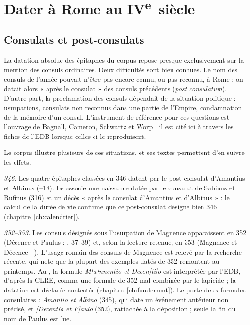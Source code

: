 \chapter{Dater à Rome au IV\textsuperscript{e}~siècle}\label{ch:dater}

\section{Consulats et post-consulats}

La datation absolue des épitaphes du corpus repose presque exclusivement sur la mention des consuls ordinaires. Deux difficultés sont bien connues. Le nom des consuls de l’année pouvait n’être pas encore connu, ou pas reconnu, à Rome : on datait alors « après le consulat » des consuls précédents (\emph{post consulatum}). D’autre part, la proclamation des consuls dépendait de la situation politique : usurpations, consulats non reconnus dans une partie de l’Empire, condamnation de la mémoire d’un consul. L’instrument de référence pour ces questions est l’ouvrage de Bagnall, Cameron, Schwartz et Worp ; il est cité ici à travers les fiches de l’EDB lorsque celles-ci le reproduisent.

Le corpus illustre plusieurs de ces situations, et ses textes permettent d’en suivre les effets.

\emph{346.} Les quatre épitaphes classées en 346 datent par le post-consulat d’Amantius et Albinus (–18). Le  associe une naissance datée par le consulat de Sabinus et Rufinus (316) et un décès « après le consulat d’Amantius et d’Albinus » : le calcul de la durée de vie confirme que ce post-consulat désigne bien 346 (chapitre~\ref{ch:calendrier}).

\emph{352–353.} Les consuls désignés sous l’usurpation de Magnence apparaissent en 352 (Décence et Paulus : , 37–39) et, selon la lecture retenue, en 353 (Magnence et Décence : ). L’usage romain des consuls de Magnence est relevé par la recherche récente, qui note que la plupart des exemples datés de 352 remontent au printemps. Au , la formule \emph{M⸢a⸣nnentio et Decen[ti]o} est interprétée par l’EDB, d’après la CLRE, comme une formule de 352 mal combinée par le lapicide ; la datation est déclarée contestée (chapitre~\ref{ch:fondement}). Le  porte deux formules consulaires : \emph{Amantio et Albino} (345), qui date un événement antérieur non précisé, et \emph{[Decentio et P]aulo} (352), rattachée à la déposition ; seule la fin du nom de Paulus est lue.

